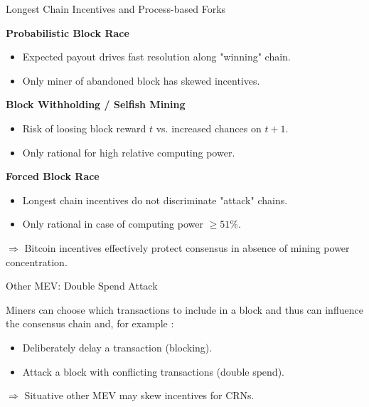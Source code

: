 \documentclass[handout]{beamer}
\begin{document}
\begin{frame}{Longest Chain Incentives and Process-based Forks}

\textbf{Probabilistic Block Race}
\begin{itemize}
	\item	Expected payout drives fast resolution along "winning" chain. 
	\item	Only miner of abandoned block has skewed incentives.
\end{itemize}

\vspace{0.5 em}

\textbf{Block Withholding / Selfish Mining}
\begin{itemize}
	\item	Risk of loosing block reward $t$ vs. increased chances on $t+1$.
	\item	Only rational for high relative computing power.
\end{itemize}

\vspace{0.5 em}

\textbf{Forced Block Race}
\begin{itemize}
	\item	Longest chain incentives do not discriminate "attack" chains.
	\item	Only rational in case of computing power $\ge 51\%$.
\end{itemize}

\vspace{1.0 em}

$\Rightarrow$ Bitcoin incentives effectively protect consensus in absence of mining power concentration.

\end{frame}

\begin{frame}{Other MEV: Double Spend Attack}

Miners can choose which transactions to include in a block and thus can influence the consensus chain and, for example :
\begin{itemize}
	\item	Deliberately delay a transaction (blocking).
	\item	Attack a block with conflicting transactions (double spend).
\end{itemize}

\vspace{0.5 em}
$\Rightarrow$ Situative other MEV may skew incentives for CRNs.


\end{frame}
\end{document}
